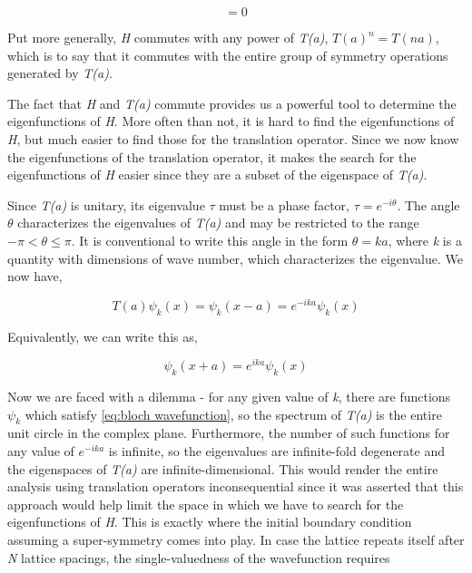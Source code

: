 \documentclass{resonance}
\begin{document}
\begin{equation}
    [T(a), H] = 0
\end{equation}

Put more generally, \textit{H} commutes with any power of \textit{T(a)}, \textit{$T(a)^{n} = T(na)$}, which is to say that it commutes with the entire group of symmetry operations generated by \textit{T(a)}. \par
The fact that \textit{H} and \textit{T(a)} commute provides us a powerful tool to determine the eigenfunctions of \textit{H}. More often than not, it is hard to find the eigenfunctions of \textit{H}, but much easier to find those for the translation operator. Since we now know the eigenfunctions of the translation operator, it makes the search for the eigenfunctions of \textit{H} easier since they are a subset of the eigenspace of \textit{T(a)}. \par
{}
Since \textit{T(a)} is unitary, its eigenvalue $\tau$ must be a phase factor, $\tau = e^{-i\theta}$. The angle $\theta$ characterizes the eigenvalues of \textit{T(a)} and may be restricted to the range $-\pi < \theta \leq \pi$. It is conventional to write this angle in the form $\theta = ka$, where \textit{k} is a quantity with dimensions of wave number,
which characterizes the eigenvalue. We now have,

\begin{equation}
    T(a) \psi_{k}(x) = \psi_{k}(x-a) = e^{-ika}\psi_{k}(x)
\end{equation}

Equivalently, we can write this as,

\begin{equation}
\label{eq:bloch wavefunction}
    \psi_{k}(x+a) = e^{ika}\psi_{k}(x)
\end{equation}

Now we are faced with a dilemma - for any given value of \textit{k}, there are functions $\psi_{k}$ which satisfy \ref{eq:bloch wavefunction}, so the spectrum of \textit{T(a)} is the entire unit circle in the complex plane. Furthermore, the number of such functions for any value of $e^{-ika}$ is infinite, so the eigenvalues are infinite-fold degenerate and the eigenspaces of \textit{T(a)} are infinite-dimensional. This would render the entire analysis using translation operators inconsequential since it was asserted that this approach would help limit the space in which we have to search for the eigenfunctions of \textit{H}. This is exactly where the initial boundary condition assuming a super-symmetry comes into play. In case the lattice repeats itself after \textit{N} lattice spacings, the single-valuedness of the wavefunction requires
\end{document}
